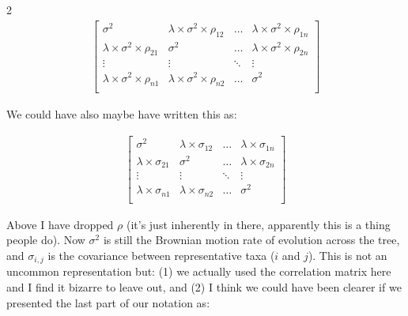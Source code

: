 \documentclass[10pt]{article}
\begin{document}
\begin{multicols}{2}
\begin{align*}
  \label{phymatnew}
\begin{bmatrix}
  \sigma^2 & \lambda \times \sigma^2 \times \rho_{12} & \ldots & \lambda \times \sigma^2 \times \rho_{1n} \\
  \lambda \times \sigma^2 \times \rho_{21} & \sigma^2 & \ldots & \lambda \times \sigma^2 \times \rho_{2n} \\
  \vdots & \vdots & \ddots & \vdots \\
  \lambda \times \sigma^2 \times \rho_{n1} & \lambda \times \sigma^2 \times \rho_{n2} & \ldots & \sigma^2\\
\end{bmatrix}
\end{align*}

We could have also maybe have written this as:

\begin{align*}
  \label{phymatalt}
\begin{bmatrix}
  \sigma^2 & \lambda \times \sigma_{12} & \ldots & \lambda \times \sigma_{1n} \\
  \lambda \times \sigma_{21} & \sigma^2 & \ldots & \lambda \times \sigma_{2n} \\
  \vdots & \vdots & \ddots & \vdots \\
  \lambda \times \sigma_{n1} & \lambda \times \sigma_{n2} & \ldots & \sigma^2 \\
\end{bmatrix}
\end{align*}

Above I have dropped $\rho$ (it's just inherently in there, apparently this is a thing people do). Now $\sigma^2$ is still the Brownian motion rate of evolution across the tree, and $\sigma_{i,j}$ is the covariance between representative taxa ($i$ and $j$). This is not an uncommon representation but: (1) we actually used the correlation matrix here and I find it bizarre to leave out, and (2) I think we could have been clearer if we presented the last part of our notation as:



\end{multicols}
\end{document}
